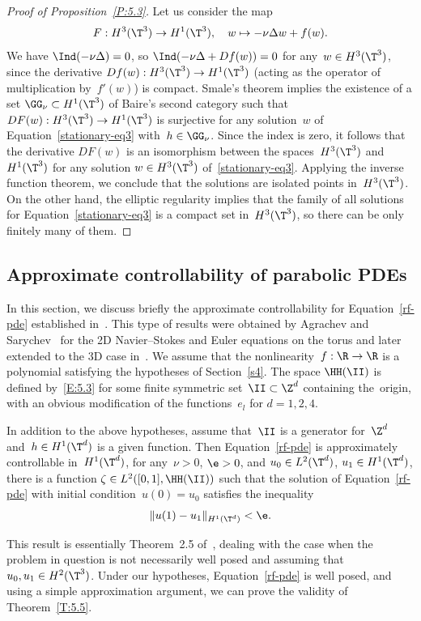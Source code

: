 \begin{proof}[Proof of Proposition~\ref{P:5.3}]
Let us consider the map
\[
F:H^3(\T^3)\to H^1(\T^3), \quad w\mapsto -\nu\Delta w+f(w).
\]
We have $\Ind(-\nu \Delta)=0$, so $\Ind(-\nu \Delta+Df(w))=0$ for any~$w\in H^3(\T^3)$, since the derivative $Df(w):H^3(\T^3)\to H^1(\T^3)$ (acting as the operator of multiplication by~$f'(w)$) is compact. Smale's theorem implies the existence of a set $\GG_\nu\subset H^1(\T^3)$ of Baire's second category such that $DF(w):H^3(\T^3)\to H^1(\T^3)$ is surjective for any solution~$w$ of Equation~\eqref{stationary-eq3} with~$h\in \GG_\nu$. Since the index is zero, it follows that the derivative $DF(w)$ is an isomorphism between the spaces~$H^3(\T^3)$ and~$H^1(\T^3)$ for any solution $w\in H^3(\T^3)$ of~\eqref{stationary-eq3}. Applying the inverse function theorem, we conclude that the solutions are isolated points in~$H^3(\T^3)$. On the other hand, the elliptic regularity implies that the family of all solutions for Equation~\eqref{stationary-eq3} is a compact set in~$H^3(\T^3)$, so there can be only finitely many of them.
\end{proof}

\subsection{Approximate controllability of parabolic PDEs}\label{S:5.4}
In this section, we discuss briefly the approximate controllability for Equation~\eqref{rf-pde} established in~\cite{nersesyan-2020}. This type of results were obtained by Agrachev and Sarychev~\cite{AS-2005, AS-2006} for the 2D Navier--Stokes and Euler equations on the torus and later extended to the 3D case in~\cite{shirikyan-cmp2006,nersisyan-2010}. We assume that the nonlinearity~$f:\R\to \R$ is a polynomial satisfying the hypotheses of Section~\ref{s4}. The space $\HH(\II)$ is defined by~\eqref{E:5.3} for some finite symmetric set~$\II\subset\Z^d$ containing the~origin, with an obvious modification of the functions~$e_l$ for $d=1,2, 4$.

\begin{theorem}\label{T:5.5}
In addition to the above hypotheses, assume that~$\II$ is a generator for~$\Z^d$ and~$h\in H^1(\T^d)$ is a given function. Then Equation~\eqref{rf-pde} is approximately controllable in~$H^1(\T^d)$, \ie for any~$\nu>0$, $\e>0$, and $u_0\in L^2(\T^d)$, $u_1\in H^1(\T^d)$, there is a function $\zeta\in L^2([0,1], \HH(\II))$ such that the solution of Equation~\eqref{rf-pde} with initial condition~$u(0)=u_0$ satisfies the inequality
\[
\|u(1) - u_1 \|_{H^1(\T^d)}<\e.
\]
\end{theorem}

This result is essentially Theorem~2.5 of~\cite{nersesyan-2020}, dealing with the case when the problem in question is not necessarily well posed and assuming that $u_0,u_1\in H^2(\T^3)$. Under our hypotheses, Equation~\eqref{rf-pde} is well posed, and using a simple approximation argument, we can prove the validity of Theorem~\ref{T:5.5}.

